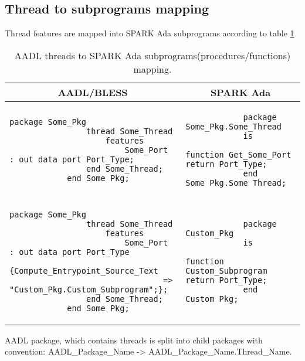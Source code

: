 \subsection{Thread to subprograms mapping}
\label{codegen:mapping:threads}

Thread features are mapped into SPARK Ada subprograms according to table \ref{table:threads2subprograms}

\begin{table}[!ht]
	\caption{AADL threads to SPARK Ada subprograms(procedures/functions) mapping.}
	\label{table:threads2subprograms}
	\centering
  	\begin{tabular}{ | p{3.5in} | p{2.5in} |}

		\hline
		\multicolumn{1}{|c|}{\textbf{AADL/BLESS}} & \multicolumn{1}{|c|}{\textbf{SPARK Ada}} \\ \hline

		\begin{lstlisting}[language=aadl]
			package Some_Pkg
				thread Some_Thread
					features
						Some_Port : out data port Port_Type;
				end Some_Thread;
			end Some_Pkg;
		\end{lstlisting} 
		& 
		\begin{lstlisting}
			package Some_Pkg.Some_Thread
			is
				function Get_Some_Port return Port_Type;
			end Some_Pkg.Some_Thread;
		\end{lstlisting} 

		\\ \hline

		\begin{lstlisting}[language=aadl]
			package Some_Pkg
				thread Some_Thread
					features
						Some_Port : out data port Port_Type
							{Compute_Entrypoint_Source_Text 
								=> "Custom_Pkg.Custom_Subprogram";};
				end Some_Thread;
			end Some_Pkg;
		\end{lstlisting} 
		& 
		\begin{lstlisting}
			package Custom_Pkg
			is
				function Custom_Subprogram return Port_Type;
			end Custom_Pkg;

		\end{lstlisting} 

		\\ \hline
	\end{tabular}
\end{table}

AADL package, which contains threads is split into child packages with convention: AADL\_Package\_Name -> AADL\_Package\_Name.Thread\_Name.

